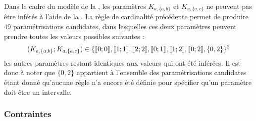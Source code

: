 \begin{example}
  Dans le cadre du modèle de la ,
  les paramètres $K_{a,\{a,b\}}$ et $K_{a,\{a,c\}}$ ne peuvent pas être inférés
  à l'aide de la .
  La règle de cardinalité précédente permet de produire 49 paramétrisations candidates,
  dans lesquelles ces deux paramètres peuvent prendre toutes les valeurs possibles suivantes :
  \begin{align*}
    (K_{a,\{a,b\}} ; K_{a,\{a,c\}}) \in \{ \mathopen{\llbracket}0\mathclose{};0\mathclose{\rrbracket} , \mathopen{\llbracket}1\mathclose{};1\mathclose{\rrbracket} , \mathopen{\llbracket}2\mathclose{};2\mathclose{\rrbracket} , \mathopen{\llbracket}0\mathclose{};1\mathclose{\rrbracket} , \mathopen{\llbracket}1\mathclose{};2\mathclose{\rrbracket} , \mathopen{\llbracket}0\mathclose{};2\mathclose{\rrbracket}, \{ 0, 2 \} \}^2
  \end{align*}
  les autres paramètres restant identiques aux valeurs qui ont été inférées.
  Il est donc à noter que $\{ 0, 2 \}$ appartient à l'ensemble des paramétrisations
  candidates étant donné qu'aucune règle n'a encore été définie pour spécifier
  qu'un paramètre doit être un intervalle.
\end{example}



\subsubsection{Contraintes}

